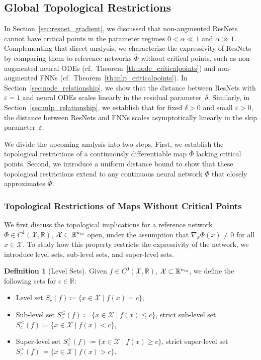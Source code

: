 \documentclass[10pt]{article}
\theoremstyle{definition}
\newtheorem{definition}[theorem]{Definition}
\numberwithin{equation}{section}
\newcommand{\eps}{\varepsilon}
\newcommand{\R}{\mathbb{R}}
\newcommand*{\nin}{n_\textup{in}}
\begin{document}
\subsection{Global Topological Restrictions}
\label{sec:resnet_tunnel}

In Section~\ref{sec:resnet_gradient}, we discussed that non-augmented ResNets cannot have critical points in the parameter regimes $0<\alpha \ll 1$ and $\alpha \gg 1$. Complementing that direct analysis, we characterize the expressivity of ResNets by comparing them to reference networks $\overline{\Phi}$ without critical points, such as non-augmented neural ODEs (cf.~Theorem~\ref{th:node_criticalpoints}) and non-augmented FNNs (cf.~Theorem~\ref{th:mlp_criticalpoints}).
In Section~\ref{sec:node_relationship}, we show that the distance between ResNets with $\eps = 1$ and neural ODEs scales linearly in the residual parameter~$\delta$. Similarly, in Section~\ref{sec:mlp_relationship}, we establish that for fixed $\delta>0$ and small $\eps>0$, the distance between ResNets and FNNs scales asymptotically linearly in the skip parameter~$\eps$.

We divide the upcoming analysis into two steps. First, we establish the topological restrictions of a continuously differentiable map $\overline{\Phi}$ lacking critical points. Second, we introduce a uniform distance bound to show that these topological restrictions extend to any continuous neural network $\Phi$ that closely approximates $\overline{\Phi}$.

\subsubsection{Topological Restrictions of Maps Without Critical Points}
\label{sec:topological_restrictions_phibar}

We first discuss the topological implications for a reference network $\overline{\Phi} \in C^1(\mathcal{X},\R)$, $\mathcal{X}\subset \R^{\nin}$ open, under the assumption that $\nabla_x\overline{\Phi}(x) \neq 0$ for all $x\in \mathcal{X}$. To study how this property restricts the expressivity of the network, we introduce level sets, sub-level sets, and super-level sets.

\begin{definition}[Level Sets]
    Given $f \in C^0(\mathcal{X},\R)$, $\mathcal{X}\subset \R^{\nin}$, we define the following sets for $c \in \R$:
    \begin{itemize}
        \item Level set $S_c(f) \coloneqq \{ x \in \mathcal{X} \mid f(x) = c\}$,
        \item Sub-level set $S_c^{\leq}(f) \coloneqq \{ x \in \mathcal{X} \mid f(x) \leq c\}$, strict sub-level set $S_c^{<}(f) \coloneqq \{ x \in \mathcal{X} \mid f(x) < c\}$,
        \item Super-level set $S_c^{\geq}(f) \coloneqq \{ x \in \mathcal{X} \mid f(x) \geq c\}$, strict super-level set $S_c^{>}(f) \coloneqq \{ x \in \mathcal{X} \mid f(x) > c\}$.
    \end{itemize}
\end{definition}
\end{document}
